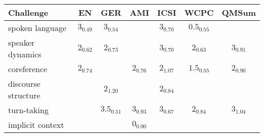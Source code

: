

\begin{table}[t]
    \centering
    \renewcommand{\arraystretch}{1.2} %
    \scriptsize
    \setlength{\tabcolsep}{4pt}
    \begin{tabular}{l c c c c c c}
        \toprule
        \rowcolor{gray!20} %
        \textbf{Challenge} & \textbf{EN} & \textbf{GER} & \textbf{AMI} & \textbf{ICSI} & \textbf{WCPC} & \textbf{QMSum} \\
        \midrule
        spoken language 
            & $3_{\textit{0.49}}$
            & $3_{\textit{0.54}}$            
            & \cellcolor{highlightGreen}{$\textbf{4}_{\textit{0.22}}$}
            & $3_{\textit{0.70}}$
            & $0.5_{\textit{0.55}}$
            & \cellcolor{highlightGreen}{$\textbf{3}_{\textit{1.35}}$} \\           
        speaker dynamics 
            & $2_{\textit{0.62}}$
            & $2_{\textit{0.73}}$            
            & \cellcolor{highlightGreen}{$\textbf{4}_{\textit{0.66}}$}
            & $3_{\textit{0.70}}$
            & $2_{\textit{0.63}}$
            & $3_{\textit{0.91}}$ \\           
        coreference 
            & $2_{\textit{0.74}}$
            & \cellcolor{highlightGreen}{$\textbf{3}_{\textit{0.80}}$}            
            & $2_{\textit{0.76}}$
            & $2_{\textit{1.07}}$
            & $1.5_{\textit{0.55}}$
            & $2_{\textit{0.90}}$ \\
        discourse structure
            & \cellcolor{highlightGreen}{$\textbf{3}_{\textit{1.00}}$}
            & $2_{\textit{1.20}}$
            & \cellcolor{highlightGreen}{$\textbf{3}_{\textit{0.93}}$}
            & $2_{\textit{0.84}}$
            & \cellcolor{highlightGreen}{$\textbf{3}_{\textit{1.17}}$}
            & \cellcolor{highlightGreen}{$\textbf{3}_{\textit{0.96}}$} \\           
        turn-taking 
            & \cellcolor{highlightGreen}{$\textbf{4}_{\textit{0.56}}$}
            & $3.5_{\textit{0.51}}$
            & $3_{\textit{0.93}}$
            & $3_{\textit{0.67}}$
            & $2_{\textit{0.84}}$
            & $3_{\textit{1.04}}$ \\           
        implicit context 
            & \cellcolor{highlightGreen}{$\textbf{4}_{\textit{0.16}}$}
            & \cellcolor{highlightGreen}{$\textbf{4}_{\textit{0.18}}$}
            & $0_{\textit{0.00}}$

\end{tabular}
\end{table}
